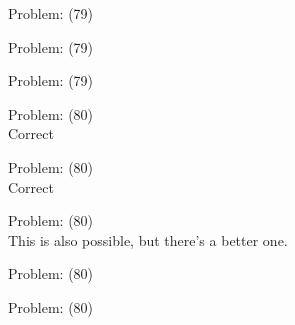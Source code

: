 \documentclass[11pt]{article}
\begin{document}
\begin{minipage}[t]{0.5\textwidth}
  {\centering
  
Problem: (79)\\
  }
\end{minipage}
\begin{minipage}[t]{0.5\textwidth}
  {\centering
  
Problem: (79)\\
  }
\end{minipage}
\begin{minipage}[t]{0.5\textwidth}
  {\centering
  
Problem: (79)\\
  }
\end{minipage}
\begin{minipage}[t]{0.5\textwidth}
  {\centering
  
Problem: (80)\\
Correct\\
  }
\end{minipage}
\begin{minipage}[t]{0.5\textwidth}
  {\centering
  
Problem: (80)\\
Correct\\
  }
\end{minipage}
\begin{minipage}[t]{0.5\textwidth}
  {\centering
  
Problem: (80)\\
This is also possible, but there's a better one.\\
  }
\end{minipage}
\begin{minipage}[t]{0.5\textwidth}
  {\centering
  
Problem: (80)\\
  }
\end{minipage}
\begin{minipage}[t]{0.5\textwidth}
  {\centering
  
Problem: (80)\\
  }
\end{minipage}
\end{document}
